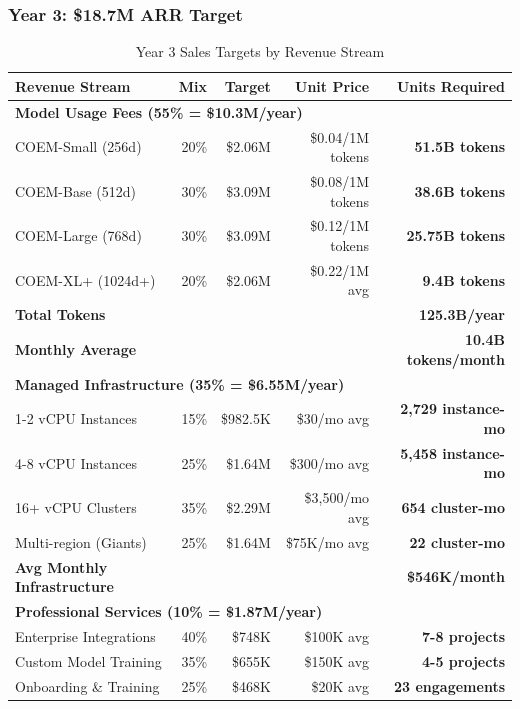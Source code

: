 \subsubsection{Year 3: \$18.7M ARR Target}

\begin{table}[ht]
\centering
\small
\begin{tabular}{|l|r|r|r|r|}
\hline
\textbf{Revenue Stream} & \textbf{Mix} & \textbf{Target} & \textbf{Unit Price} & \textbf{Units Required} \\
\hline
\multicolumn{5}{|l|}{\textbf{Model Usage Fees (55\% = \$10.3M/year)}} \\
\hline
COEM-Small (256d) & 20\% & \$2.06M & \$0.04/1M tokens & \textbf{51.5B tokens} \\
COEM-Base (512d) & 30\% & \$3.09M & \$0.08/1M tokens & \textbf{38.6B tokens} \\
COEM-Large (768d) & 30\% & \$3.09M & \$0.12/1M tokens & \textbf{25.75B tokens} \\
COEM-XL+ (1024d+) & 20\% & \$2.06M & \$0.22/1M avg & \textbf{9.4B tokens} \\
\hline
\textbf{Total Tokens} & & & & \textbf{125.3B/year} \\
\textbf{Monthly Average} & & & & \textbf{10.4B tokens/month} \\
\hline
\multicolumn{5}{|l|}{\textbf{Managed Infrastructure (35\% = \$6.55M/year)}} \\
\hline
1-2 vCPU Instances & 15\% & \$982.5K & \$30/mo avg & \textbf{2,729 instance-mo} \\
4-8 vCPU Instances & 25\% & \$1.64M & \$300/mo avg & \textbf{5,458 instance-mo} \\
16+ vCPU Clusters & 35\% & \$2.29M & \$3,500/mo avg & \textbf{654 cluster-mo} \\
Multi-region (Giants) & 25\% & \$1.64M & \$75K/mo avg & \textbf{22 cluster-mo} \\
\hline
\textbf{Avg Monthly Infrastructure} & & & & \textbf{\$546K/month} \\
\hline
\multicolumn{5}{|l|}{\textbf{Professional Services (10\% = \$1.87M/year)}} \\
\hline
Enterprise Integrations & 40\% & \$748K & \$100K avg & \textbf{7-8 projects} \\
Custom Model Training & 35\% & \$655K & \$150K avg & \textbf{4-5 projects} \\
Onboarding \& Training & 25\% & \$468K & \$20K avg & \textbf{23 engagements} \\
\hline
\end{tabular}
\caption{Year 3 Sales Targets by Revenue Stream}
\end{table}

